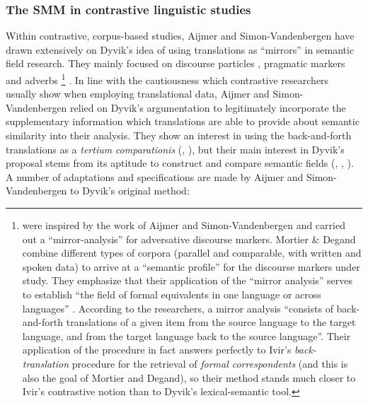 \subsubsection{The SMM in contrastive linguistic studies}
\label{sec:2.3.4.4} 
Within contrastive, corpus-based studies, Aijmer and Simon-Vandenbergen have drawn extensively on Dyvik’s idea of using translations as “mirrors” in semantic field research. They mainly focused on discourse particles \citep{simon-vandenbergen_english_2013}, pragmatic markers \citep{simon-vandenbergen_expectation_2002-2003,aijmer_model_2004,fischer_pragmatic_2006} and adverbs \citep{simon-vandenbergen_semantic_2007,simon-vandenbergen_english_2013}\footnote{\citet{mortier_adversative_2009} were inspired by the work of Aijmer and Simon-Vandenbergen and carried out a “mirror-analysis” for adversative discourse markers. Mortier \& Degand combine different types of corpora (parallel and comparable, with written and spoken data) to arrive at a “semantic profile” for the discourse markers under study. They emphasize that their application of the “mirror analysis” serves to establish “the field of formal equivalents in one language or across languages” \citep[309]{mortier_adversative_2009}. According to the researchers, a mirror analysis “consists of back-and-forth translations of a given item from the source language to the target language, and from the target language back to the source language”. Their application of the procedure in fact answers perfectly to Ivir’s \textit{back-translation} procedure for the retrieval of \textit{formal correspondents} (and this is also the goal of Mortier and Degand), so their method stands much closer to Ivir’s contrastive notion than to Dyvik’s lexical-semantic tool.} . In line with the cautiousness which contrastive researchers usually show when employing translational data, Aijmer and Simon-Vandenbergen relied on Dyvik’s argumentation to legitimately incorporate the supplementary information which translations are able to provide about semantic similarity into their analysis. They show an interest in using the back-and-forth translations as a \textit{tertium} \textit{comparationis} (\citealt[16]{simon-vandenbergen_expectation_2002-2003}, \citealt[1795]{aijmer_model_2004}), but their main interest in Dyvik’s proposal stems from its aptitude to construct and compare semantic fields (\citealt[1131]{aijmer_discourse_2003}, \citealt[1782]{aijmer_model_2004}, \citealt[13]{simon-vandenbergen_expectation_2002-2003}). A number of adaptations and specifications are made by Aijmer and Simon-Vandenbergen to Dyvik’s original method:

